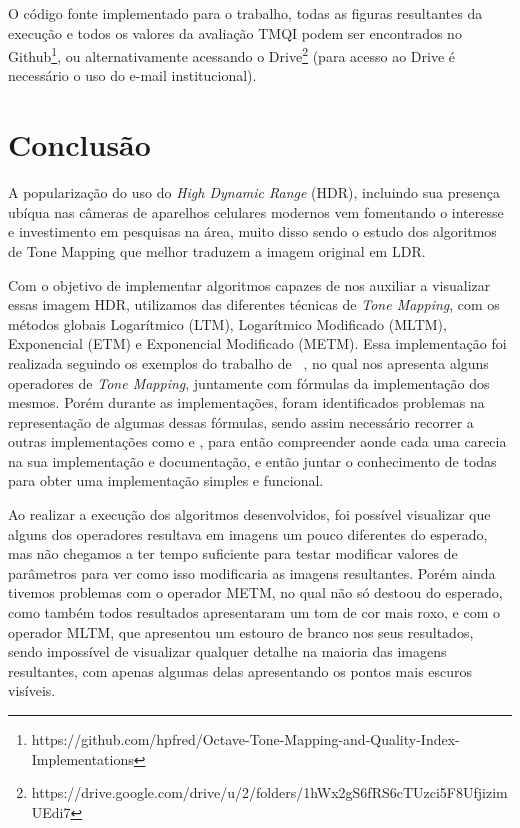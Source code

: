 \documentclass[conference]{IEEEtran}
\begin{document}
O código fonte implementado para o trabalho, todas as figuras resultantes da execução e todos os valores da avaliação TMQI podem ser encontrados no Github\footnote{https://github.com/hpfred/Octave-Tone-Mapping-and-Quality-Index-Implementations}, ou alternativamente acessando o Drive\footnote{https://drive.google.com/drive/u/2/folders/1hWx2gS6fRS6cTUzci5F8UfjizimUEdi7} (para acesso ao Drive é necessário o uso do e-mail institucional).

\section{Conclusão}

A popularização do uso do \textit{High Dynamic Range} (HDR), incluindo sua presença ubíqua nas câmeras de aparelhos celulares modernos vem fomentando o interesse e investimento em pesquisas na área, muito disso sendo o estudo dos algoritmos de Tone Mapping que melhor traduzem a imagem original em LDR.

Com o objetivo de implementar algoritmos capazes de nos auxiliar a visualizar essas imagem HDR, utilizamos das diferentes técnicas de \textit{Tone Mapping}, com os métodos globais Logarítmico (LTM), Logarítmico Modificado (MLTM), Exponencial (ETM) e Exponencial Modificado (METM). Essa implementação foi realizada seguindo os exemplos do trabalho de ~\cite{ICIAS}, no qual nos apresenta alguns operadores de \textit{Tone Mapping}, juntamente com fórmulas da implementação dos mesmos. Porém durante as implementações, foram identificados problemas na representação de algumas dessas fórmulas, sendo assim necessário recorrer a outras implementações como \cite{TMLib} e \cite{Duarte:2016}, para então compreender aonde cada uma carecia na sua implementação e documentação, e então juntar o conhecimento de todas para obter uma implementação simples e funcional.

Ao realizar a execução dos algoritmos desenvolvidos, foi possível visualizar que alguns dos operadores resultava em imagens um pouco diferentes do esperado, mas não chegamos a ter tempo suficiente para testar modificar valores de parâmetros para ver como isso modificaria as imagens resultantes. Porém ainda tivemos problemas com o operador METM, no qual não só destoou do esperado, como também todos resultados apresentaram um tom de cor mais roxo, e com o operador MLTM, que apresentou um estouro de branco nos seus resultados, sendo impossível de visualizar qualquer detalhe na maioria das imagens resultantes, com apenas algumas delas apresentando os pontos mais escuros visíveis.
\end{document}
